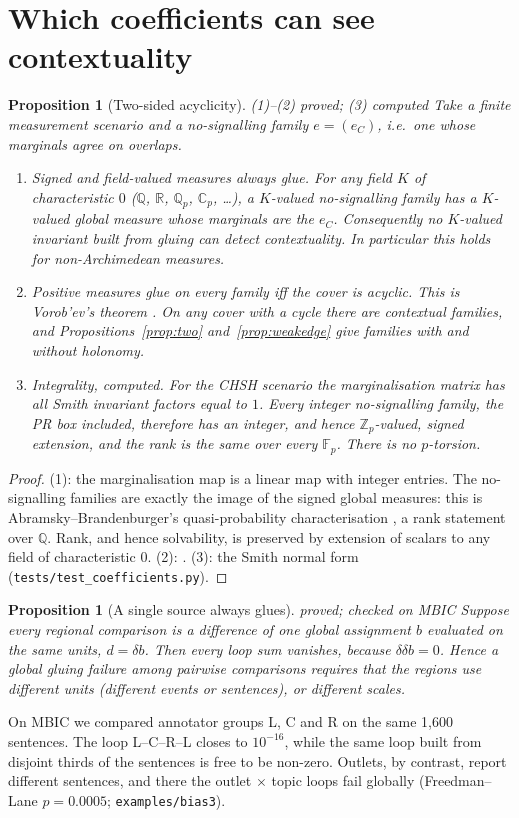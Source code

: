 \documentclass[11pt]{article}
\newtheorem{proposition}[theorem]{Proposition}
\theoremstyle{definition}
\theoremstyle{remark}
\newcommand{\Z}{\mathbb{Z}}
\newcommand{\Q}{\mathbb{Q}}
\newcommand{\R}{\mathbb{R}}
\newcommand{\F}{\mathbb{F}}
\newcommand{\st}[1]{\textsf{\small\color{gray}#1}}
\begin{document}
\section{Which coefficients can see contextuality}\label{sec:coeffs}
\begin{proposition}[Two-sided acyclicity]\label{prop:twoside}\st{(1)--(2) proved; (3) computed}
Take a finite measurement scenario and a no-signalling family $e=(e_C)$, i.e.\ one whose marginals agree on overlaps.
\begin{enumerate}
  \item \emph{Signed and field-valued measures always glue.} For any field $K$ of characteristic $0$ ($\Q$, $\R$, $\Q_p$, $\mathbb{C}_p$, \dots), a $K$-valued no-signalling family has a $K$-valued global measure whose marginals are the $e_C$. Consequently no $K$-valued invariant built from gluing can detect contextuality. In particular this holds for non-Archimedean measures.
  \item \emph{Positive measures glue on every family iff the cover is acyclic.} This is Vorob'ev's theorem \cite{vorobev}. On any cover with a cycle there are contextual families, and Propositions~\ref{prop:two} and~\ref{prop:weakedge} give families with and without holonomy.
  \item \emph{Integrality, computed.} For the CHSH scenario the marginalisation matrix has all Smith invariant factors equal to $1$. Every integer no-signalling family, the PR box included, therefore has an integer, and hence $\Z_p$-valued, signed extension, and the rank is the same over every $\F_p$. There is no $p$-torsion.
\end{enumerate}
\end{proposition}
\begin{proof}
(1): the marginalisation map is a linear map with integer entries. The no-signalling families are exactly the image of the signed global measures: this is Abramsky--Brandenburger's quasi-probability characterisation \cite{ab11}, a rank statement over $\Q$. Rank, and hence solvability, is preserved by extension of scalars to any field of characteristic $0$.
(2): \cite{vorobev}.
(3): the Smith normal form (\texttt{tests/test\_coefficients.py}).
\end{proof}

\begin{proposition}[A single source always glues]\label{prop:singlesource}\st{proved; checked on MBIC}
Suppose every regional comparison is a difference of one global assignment $b$ evaluated on the same units, $d=\delta b$. Then every loop sum vanishes, because $\delta\delta b=0$. Hence a global gluing failure among pairwise comparisons requires that the regions use different units (different events or sentences), or different scales.
\end{proposition}
\noindent On MBIC we compared annotator groups L, C and R on the same 1{,}600 sentences. The loop L--C--R--L closes to $10^{-16}$, while the same loop built from disjoint thirds of the sentences is free to be non-zero. Outlets, by contrast, report different sentences, and there the outlet $\times$ topic loops fail globally (Freedman--Lane $p=0.0005$; \texttt{examples/bias3}).
\end{document}
